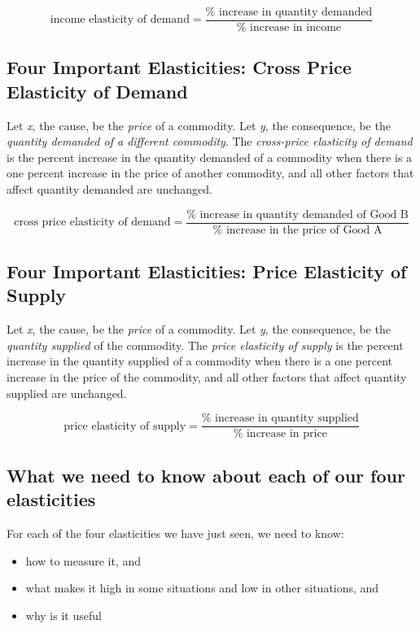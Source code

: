 \documentclass[
  letterpaper,
]{book}
\providecommand{\tightlist}{%
  \setlength{\itemsep}{0pt}\setlength{\parskip}{0pt}}\usepackage{longtable,booktabs,array}
\begin{document}
\[
\text{income elasticity of demand}=\frac{\text{%
\]

\subsection{Four Important Elasticities: Cross Price Elasticity of
Demand}\label{four-important-elasticities-cross-price-elasticity-of-demand}

Let \emph{x}, the cause, be the \emph{price} of a commodity. Let
\emph{y}, the consequence, be the \emph{quantity demanded of a different
commodity}. The \emph{cross-price elasticity of demand} is the percent
increase in the quantity demanded of a commodity when there is a one
percent increase in the price of another commodity, and all other
factors that affect quantity demanded are unchanged.

\[
\text{cross price elasticity of demand}=\frac{\text{%
\]

\subsection{Four Important Elasticities: Price Elasticity of
Supply}\label{four-important-elasticities-price-elasticity-of-supply}

Let \emph{x}, the cause, be the \emph{price} of a commodity. Let
\emph{y}, the consequence, be the \emph{quantity supplied} of the
commodity. The \emph{price elasticity of supply} is the percent increase
in the quantity supplied of a commodity when there is a one percent
increase in the price of the commodity, and all other factors that
affect quantity supplied are unchanged.

\[
\text{price elasticity of supply}=\frac{\text{%
\]

\subsection{What we need to know about each of our four
elasticities}\label{what-we-need-to-know-about-each-of-our-four-elasticities}

For each of the four elasticities we have just seen, we need to know:

\begin{itemize}
\tightlist
\item
  how to measure it, and
\item
  what makes it high in some situations and low in other situations, and
\item
  why is it useful
\end{itemize}
\end{document}
